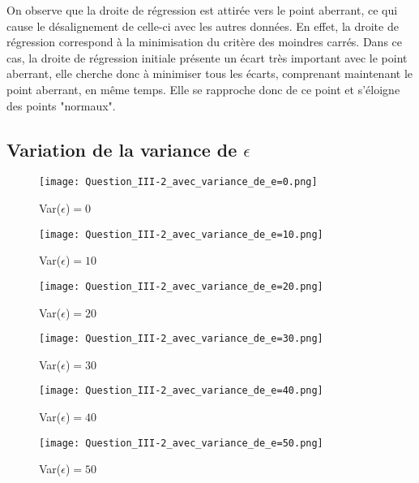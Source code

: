 \documentclass[paper=a4, fontsize=11pt]{scrartcl} %
\numberwithin{equation}{section} %
\numberwithin{figure}{section} %
\numberwithin{table}{section} %
\begin{document}
On observe que la droite de régression est attirée vers le point aberrant, ce qui cause le désalignement de celle-ci avec les autres données. En effet, la droite de régression correspond à la minimisation du critère des moindres carrés. Dans ce cas, la droite de régression initiale présente un écart très important avec le point aberrant, elle cherche donc à minimiser tous les écarts, comprenant maintenant le point aberrant, en même temps. Elle se rapproche donc de ce point et s'éloigne des points "normaux".
\newpage
\subsection{Variation de la variance de $\epsilon$}

\begin{figure}[!htb]
  \texttt{[image: Question\_III-2\_avec\_variance\_de\_e=0.png]}
  \caption{Var($\epsilon$)$=0$}\label{fig:3-2_var_e_0}
\endminipage\hfill
{}
  \texttt{[image: Question\_III-2\_avec\_variance\_de\_e=10.png]}
  \caption{Var($\epsilon$)$=10$}\label{fig:3-2_var_e_10}
\endminipage\hfill
{}
  \texttt{[image: Question\_III-2\_avec\_variance\_de\_e=20.png]}
  \caption{Var($\epsilon$)$=20$}\label{fig:3-2_var_e_20}
\endminipage
\end{figure}
\begin{figure}[!htb]
  \texttt{[image: Question\_III-2\_avec\_variance\_de\_e=30.png]}
  \caption{Var($\epsilon$)$=30$}\label{fig:3-2_var_e_30}
\endminipage\hfill
{}
  \texttt{[image: Question\_III-2\_avec\_variance\_de\_e=40.png]}
  \caption{Var($\epsilon$)$=40$}\label{fig:3-2_var_e_40}
\endminipage\hfill
{}
  \texttt{[image: Question\_III-2\_avec\_variance\_de\_e=50.png]}
  \caption{Var($\epsilon$)$=50$}\label{fig:3-2_var_e_50}
\endminipage
\end{figure}
\end{document}
